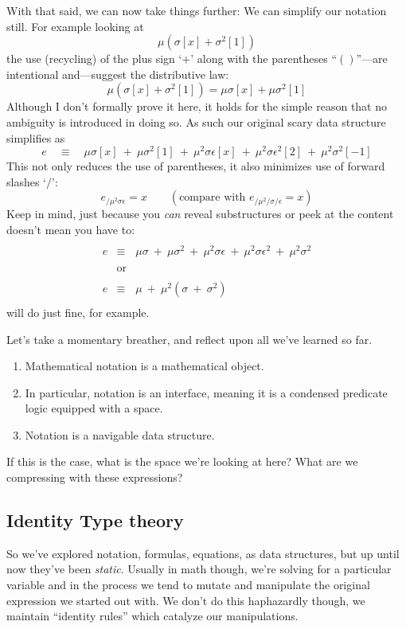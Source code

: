 \documentclass[twoside]{article}
\begin{document}
With that said, we can now take things further: We can simplify our notation still. For example looking at
$$ \mu(\sigma[x]+\sigma^2[1]) $$
the use (recycling) of the plus sign `$ + $' along with the parentheses
``$ () $''---are intentional and---suggest the distributive law:
$$ \mu(\sigma[x]+\sigma^2[1])=\mu\sigma[x]+\mu\sigma^2[1] $$
Although I don't formally prove it here, it holds for the simple reason that no ambiguity is introduced in doing so.
As such our original scary data structure simplifies as
$$ e\quad\equiv\quad \mu\sigma[x]\ +\ \mu\sigma^2[1]\ +\ \mu^2\sigma\epsilon[x]\ +\ \mu^2\sigma\epsilon^2[2]\ +\ \mu^2\sigma^2[-1] $$
This not only reduces the use of parentheses, it also minimizes use of forward slashes `$ / $':
$$ e_{/\mu^2\sigma\epsilon}=x\qquad(\mbox{compare with } e_{/\mu^2/\sigma/\epsilon}=x) $$
Keep in mind, just because you \emph{can} reveal substructures or peek at the content doesn't mean you have to:
$$ \begin{array}{rcl}
																	\\
e		& \equiv	& \mu\sigma\ +\ \mu\sigma^2\ +\ \mu^2\sigma\epsilon\ +\ \mu^2\sigma\epsilon^2\ +\ \mu^2\sigma^2		\\
																	\\
		& \mbox{or}	&													\\
																	\\
e		& \equiv	& \mu\ +\ \mu^2(\sigma\ +\ \sigma^2)									\\
\end{array} $$
will do just fine, for example.

Let's take a momentary breather, and reflect upon all we've learned so far.
\begin{enumerate}
\item Mathematical notation is a mathematical object.
\item In particular, notation is an interface, meaning it is a condensed predicate logic equipped with a space.
\item Notation is a navigable data structure.
\end{enumerate}
If this is the case, what is the space we're looking at here? What are we compressing with these expressions?

\subsection*{Identity Type theory}

So we've explored notation, formulas, equations, as data structures, but up until now they've been \emph{static}.
Usually in math though, we're solving for a particular variable and in the process we tend to mutate and manipulate
the original expression we started out with. We don't do this haphazardly though, we maintain ``identity rules''
which catalyze our manipulations.
\end{document}

